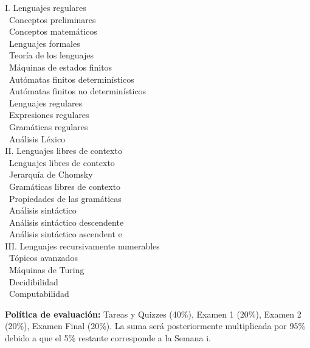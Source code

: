 \documentclass[12pt, letterpaper, oneside]{article}
\newcommand{\topic}{{\color{darkgreen}{\Rectangle}}}
\newcommand{\subtopic}{{\enskip \color{darkblue}{\Rectangle}}}
\begin{document}
  \begin{center} 
  \begin{minipage}{5in}
  \begin{flushleft}
  {\large I. Lenguajes regulares} \\[2ex]
  \topic ~Conceptos preliminares \\
  \subtopic ~Conceptos matemáticos \\
  \subtopic ~Lenguajes formales \\
  \topic ~Teoría de los lenguajes \\
  \subtopic ~Máquinas de estados finitos \\
  \subtopic ~Autómatas finitos determinísticos \\
  \subtopic ~Autómatas finitos no determinísticos \\
  \topic ~Lenguajes regulares \\
  \subtopic ~Expresiones regulares \\
  \subtopic ~Gramáticas regulares \\
  \subtopic ~Análisis Léxico \\[2.5ex]
  {\large II. Lenguajes libres de contexto }\\[2ex]
  \topic ~Lenguajes libres de contexto \\
  \subtopic ~Jerarquía de Chomsky \\
  \subtopic ~Gramáticas libres de contexto \\
  \subtopic ~Propiedades de las gramáticas \\
  \topic ~Análisis sintáctico \\
  \subtopic ~Análisis sintáctico descendente \\
  \subtopic ~Análisis sintáctico ascendent e\\[2.5ex]
  {\large III. Lenguajes recursivamente numerables} \\[2ex]
  \topic ~Tópicos avanzados \\
  \subtopic ~Máquinas de Turing \\
  \subtopic ~Decidibilidad \\
  \subtopic ~Computabilidad
  \end{flushleft}
  \end{minipage}
  \end{center}

  \vspace*{.15in}
  \noindent\textbf{Política de evaluación:}
  Tareas y Quizzes (40\%), Examen 1 (20\%), Examen 2 (20\%), Examen Final (20\%).
  La suma será posteriormente multiplicada por 95\% debido a que el 5\% restante corresponde a la Semana i.
\end{document}
